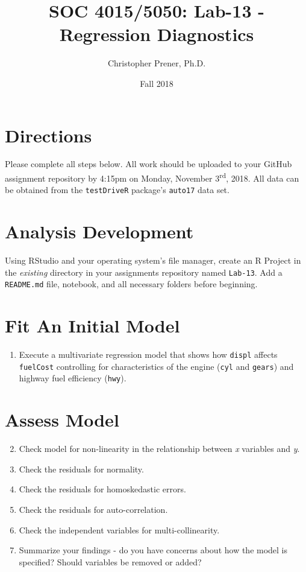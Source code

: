 \documentclass{tufte-handout}
\title{SOC 4015/5050: Lab-13 - Regression Diagnostics}
\author{Christopher Prener, Ph.D.}
\date{Fall 2018}
\begin{document}

\maketitle %


\vspace{5mm}
\section{Directions}
Please complete all steps below. All work should be uploaded to your GitHub assignment repository by 4:15pm on Monday, November 3\textsuperscript{rd}, 2018. All data can be obtained from the \texttt{testDriveR} package's \texttt{auto17} data set.

\vspace{5mm}
\section{Analysis Development}
Using RStudio and your operating system's file manager, create an R Project in the \textit{existing} directory in your assignments repository named \texttt{Lab-13}. Add a \texttt{README.md} file, notebook, and all necessary folders before beginning.

\vspace{3mm}
\section{Fit An Initial Model}
\begin{enumerate}
\item Execute a multivariate regression model that shows how \texttt{displ} affects \texttt{fuelCost} controlling for characteristics of the engine (\texttt{cyl} and \texttt{gears}) and highway fuel efficiency (\texttt{hwy}).
\end{enumerate}

\vspace{3mm}
\section{Assess Model}
\begin{enumerate}
\setcounter{enumi}{1}
\item Check model for non-linearity in the relationship between \textit{x} variables and \textit{y}.
\item Check the residuals for normality.
\item Check the residuals for homoskedastic errors.
\item Check the residuals for auto-correlation.
\item Check the independent variables for multi-collinearity.
\item Summarize your findings - do you have concerns about how the model is specified? Should variables be removed or added?
\end{enumerate}
\end{document}
